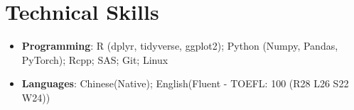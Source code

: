 \documentclass[letterpaper,11pt]{article}
\makeatletter
\newcommand{\resumeItem}[1]{
  \item\small{
    {#1 \vspace{-2pt}}
  }
}
\newcommand{\resumeSubheading}[4]{
  \vspace{-2pt}\item
    \begin{tabular*}{1.0\textwidth}[t]{l@{\extracolsep{\fill}}r}
      \textbf{#1} & \textbf{\small #2} \\
      \textit{\small#3} & \textit{\small #4} \\
    \end{tabular*}\vspace{-8pt}
}
\newcommand{\resumeSubHeadingListStart}{\begin{itemize}[leftmargin=0.0in, label={}]}
\newcommand{\resumeSubHeadingListEnd}{\end{itemize}}
\newcommand{\resumeItemListStart}{\begin{itemize}}
\newcommand{\resumeItemListEnd}{\end{itemize}\vspace{-5pt}}
\makeatother
\begin{document}
\section{Technical Skills}
 \begin{itemize}[leftmargin=0.15in, label={}, itemsep=-2pt]
    \small \item
     \textbf{Programming}{: R (dplyr, tidyverse, ggplot2); Python (Numpy, Pandas, PyTorch); Rcpp; SAS; Git; Linux} \\
     \item \textbf{Languages}{: Chinese(Native); English(Fluent - TOEFL: 100 (R28 L26 S22 W24))} \\
    
 \end{itemize}
 \vspace{-10pt}


    
        


    
\end{document}
